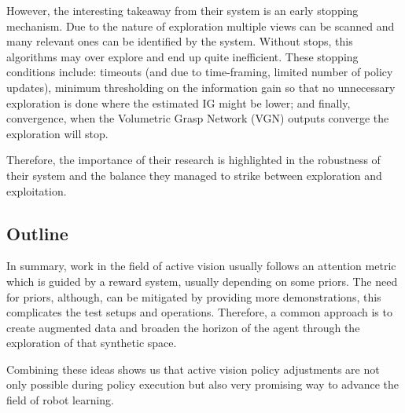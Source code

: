 However, the interesting takeaway from their system is an early stopping mechanism. Due to the nature of exploration multiple views can be scanned and many relevant ones can be identified by the system. Without stops, this algorithms may over explore and end up quite inefficient. These stopping conditions include: timeouts (and due to time-framing, limited number of policy updates), minimum thresholding on the information gain so that no unnecessary exploration is done where the estimated IG might be lower; and finally, convergence, when the Volumetric Grasp Network (VGN) \cite{breyer2021volumetricgraspingnetworkrealtime} outputs converge the exploration will stop. 

Therefore, the importance of their research is highlighted in the robustness of their system and the balance they managed to strike between exploration and exploitation. 


\subsection{Outline}
In summary, work in the field of active vision usually follows an attention metric which is guided by a reward system, usually depending on some priors. The need for priors, although, can be mitigated by providing more demonstrations, this complicates the test setups and operations. Therefore, a common approach is to create augmented data and broaden the horizon of the agent through the exploration of that synthetic space.

Combining these ideas shows us that active vision policy adjustments are not only possible during policy execution but also very promising way to advance the field of robot learning.



